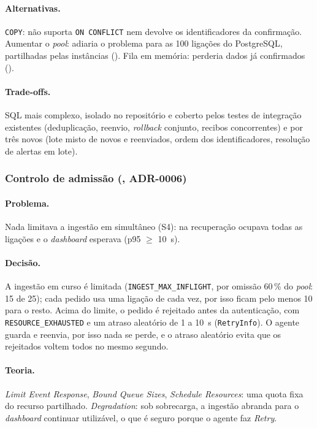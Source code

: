 \paragraph{Alternativas.}
\texttt{COPY}: não suporta \texttt{ON CONFLICT} nem devolve os identificadores da confirmação. Aumentar o
\emph{pool}: adiaria o problema para as 100 ligações do PostgreSQL, partilhadas pelas instâncias (). Fila em
memória: perderia dados já confirmados ().

\paragraph{Trade-offs.}
SQL mais complexo, isolado no repositório e coberto pelos testes de integração existentes (deduplicação, reenvio,
\emph{rollback} conjunto, recibos concorrentes) e por três novos (lote misto de novos e reenviados, ordem dos
identificadores, resolução de alertas em lote).

\subsubsection{Controlo de admissão (, ADR-0006)}
\label{sec:d6}

\paragraph{Problema.}
Nada limitava a ingestão em simultâneo (S4): na recuperação ocupava todas as ligações e o \emph{dashboard}
esperava (p95 $\ge$ 10~s).

\paragraph{Decisão.}
A ingestão em curso é limitada (\texttt{INGEST\_MAX\_INFLIGHT}, por omissão 60\,\% do \emph{pool}: 15 de 25);
cada pedido usa uma ligação de cada vez, por isso ficam pelo menos 10 para o resto. Acima do limite, o pedido é
rejeitado antes da autenticação, com \texttt{RESOURCE\_EXHAUSTED} e um atraso aleatório de 1 a 10~s
(\texttt{RetryInfo}). O agente guarda e reenvia, por isso nada se perde, e o atraso aleatório evita que os
rejeitados voltem todos no mesmo segundo.

\paragraph{Teoria.}
\emph{Limit Event Response}, \emph{Bound Queue Sizes}, \emph{Schedule Resources}: uma quota fixa do recurso
partilhado. \emph{Degradation}: sob sobrecarga, a ingestão abranda para o \emph{dashboard} continuar utilizável, o
que é seguro porque o agente faz \emph{Retry}.

